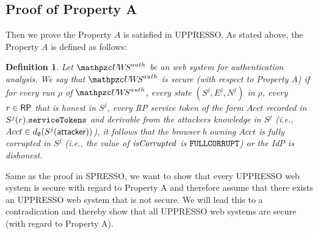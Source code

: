 \documentclass[letterpaper,onecolumn,10pt]{article}
\newtheorem{definition}{Definition}
\begin{document}
\subsection{Proof of Property A}
Then we prove the Property $A$ is satisfied in UPPRESSO.
As stated above, the Property $A$ is defined as follows:
\begin{definition}\label{def:uppresso-security-property} Let $\uppressoauthwebsystem$ 
  be an \uppresso web system for authentication analysis. We say that 
  \emph{$\uppressoauthwebsystem$ is secure (with respect to Property A)} if for every
  run $\rho$ of $\uppressoauthwebsystem$, every state $(S^j, E^j, N^j)$ in $\rho$,
  every $r\in \mathsf{RP}$ that is honest in $S^j$, every RP service token of the form 
  $Acct$ recorded in $S^j(r).\mathtt{serviceTokens}$ and derivable from the attackers
  knowledge in $S^j$ (i.e., $Acct \in d_{\emptyset}(S^j(\mathsf{attacker}))$), it 
  follows that the browser $b$ owning $Acct$ is fully corrupted in $S^j$ (i.e., the 
  value of $\mathit{isCorrupted}$ is $\mathtt{FULLCORRUPT}$) or the IdP is dishonest. 
\end{definition}



Same as the proof in SPRESSO, we want to show that every UPPRESSO web system is secure with regard to Property A and therefore assume that there exists an UPPRESSO web system that is not secure. We will lead this to a contradication and thereby show that all UPPRESSO web systems are secure (with regard to Property A).

\end{document}
